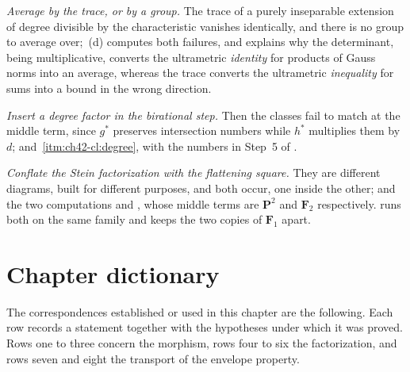 \emph{Average by the trace, or by a group.}  The trace of a purely
inseparable extension of degree divisible by the characteristic vanishes
identically, and there is no group to average over;
\,(d) computes both failures, and
 explains why the determinant, being
multiplicative, converts the ultrametric \emph{identity} for products of
Gauss norms into an average, whereas the trace converts the ultrametric
\emph{inequality} for sums into a bound in the wrong direction.

\emph{Insert a degree factor in the birational step.}  Then the classes fail
to match at the middle term, since $g^*$ preserves intersection numbers
while $h^*$ multiplies them by $d$;
 and
\,\cref{itm:ch42-cl:degree}, with the numbers in
Step~5 of .

\emph{Conflate the Stein factorization with the flattening square.}  They
are different diagrams, built for different purposes, and both occur, one
inside the other;
 and the two computations
 and , whose middle
terms are $\mathbf P^2$ and $\mathbf F_2$ respectively.
 runs both on the same family and keeps the two
copies of $\mathbf F_1$ apart.

\section{Chapter dictionary}
\label{sec:ch42-dictionary}

The correspondences established or used in this chapter are the following.
Each row records a statement together with the hypotheses under which it was
proved.  Rows one to three concern the morphism, rows four to six the
factorization, and rows seven and eight the transport of the envelope
property.

